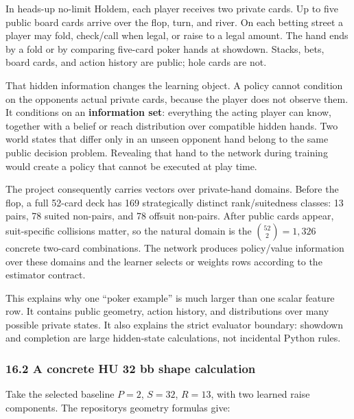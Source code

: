 \documentclass[
  10pt,
  letterpaper,
]{article}
\begin{document}
In heads-up no-limit Hold\textquotesingle em, each player receives two
private cards. Up to five public board cards arrive over the flop, turn,
and river. On each betting street a player may fold, check/call when
legal, or raise to a legal amount. The hand ends by a fold or by
comparing five-card poker hands at showdown. Stacks, bets, board cards,
and action history are public; hole cards are not.

That hidden information changes the learning object. A policy cannot
condition on the opponent\textquotesingle s actual private cards,
because the player does not observe them. It conditions on an
\textbf{information set}: everything the acting player can know,
together with a belief or reach distribution over compatible hidden
hands. Two world states that differ only in an unseen opponent hand
belong to the same public decision problem. Revealing that hand to the
network during training would create a policy that cannot be executed at
play time.

The project consequently carries vectors over private-hand domains.
Before the flop, a full 52-card deck has 169 strategically distinct
rank/suitedness classes: 13 pairs, 78 suited non-pairs, and 78 offsuit
non-pairs. After public cards appear, suit-specific collisions matter,
so the natural domain is the \(\binom{52}{2}=1,326\) concrete two-card
combinations. The network produces policy/value information over these
domains and the learner selects or weights rows according to the
estimator contract.

This explains why one ``poker example'' is much larger than one scalar
feature row. It contains public geometry, action history, and
distributions over many possible private states. It also explains the
strict evaluator boundary: showdown and completion are large
hidden-state calculations, not incidental Python rules.

\subsubsection{16.2 A concrete HU 32 bb shape
calculation}\label{162-a-concrete-hu-32-bb-shape-calculation}

Take the selected baseline \(P=2\), \(S=32\), \(R=13\), with two learned
raise components. The repository\textquotesingle s geometry formulas
give:
\end{document}

